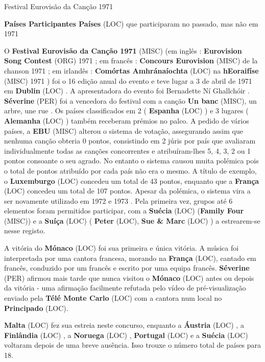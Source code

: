 \documentclass[12pt,a4paper]{article}
\begin{document}
Festival Eurovisão da Canção 1971



\textbf{Países Participantes Países} (LOC) que participaram no passado, mas não em 1971

O \textbf{Festival Eurovisão da Canção 1971} (MISC) (em inglês : \textbf{Eurovision Song Contest} (ORG) 1971 ; em francês : \textbf{Concours Eurovision} (MISC) de la chanson 1971 ; em irlandês : \textbf{Comórtas Amhránaíochta} (LOC) na \textbf{hEoraifíse} (MISC) 1971 ) foi o 16 edição anual do evento e teve lugar a 3 de abril de 1971 em \textbf{Dublin} (LOC) . A apresentadora do evento foi Bernadette Ní Ghallchóir . \textbf{Séverine} (PER) foi a vencedora do festival com a canção \textbf{Un banc} (MISC), un arbre, une rue . Os países classificados em 2 ( \textbf{Espanha} (LOC) ) e 3 lugares ( \textbf{Alemanha} (LOC) ) também receberam prémios no palco. A pedido de vários países, a \textbf{EBU} (MISC) alterou o sistema de votação, assegurando assim que nenhuma canção obteria 0 pontos, consistindo em 2 júris por país que avaliaram individualmente todas as canções concorrentes e atribuíram-lhes 5, 4, 3, 2 ou 1 pontos consoante o seu agrado. No entanto o sistema causou muita polémica pois o total de pontos atribuído por cada país não era o mesmo. A título de exemplo, o \textbf{Luxemburgo} (LOC) concedeu um total de 43 pontos, enquanto que a \textbf{França} (LOC) concedeu um total de 107 pontos. Apesar da polémica, o sistema vira a ser novamente utilizado em 1972 e 1973 . Pela primeira vez, grupos até 6 elementos foram permitidos participar, com a \textbf{Suécia} (LOC) (\textbf{Family Four} (MISC)) e a \textbf{Suíça} (LOC) ( \textbf{Peter} (LOC), \textbf{Sue \& Marc} (LOC) ) a estrearem-se nesse registo.

A vitória do \textbf{Mónaco} (LOC) foi sua primeira e única vitória. A música foi interpretada por uma cantora francesa, morando na \textbf{França} (LOC), cantado em francês, conduzido por um francês e escrito por uma equipa francês. \textbf{Séverine} (PER) afirmou mais tarde que nunca visitou o \textbf{Mónaco} (LOC) antes ou depois da vitória - uma afirmação facilmente refutada pelo vídeo de pré-visualização enviado pela \textbf{Télé Monte Carlo} (LOC) com a cantora num local no \textbf{Principado} (LOC).

\textbf{Malta} (LOC) fez sua estreia neste concurso, enquanto a \textbf{Áustria} (LOC) , a \textbf{Finlândia} (LOC) , a \textbf{Noruega} (LOC) , \textbf{Portugal} (LOC) e a \textbf{Suécia} (LOC) voltaram depois de uma breve ausência. Isso trouxe o número total de países para 18.
\end{document}
